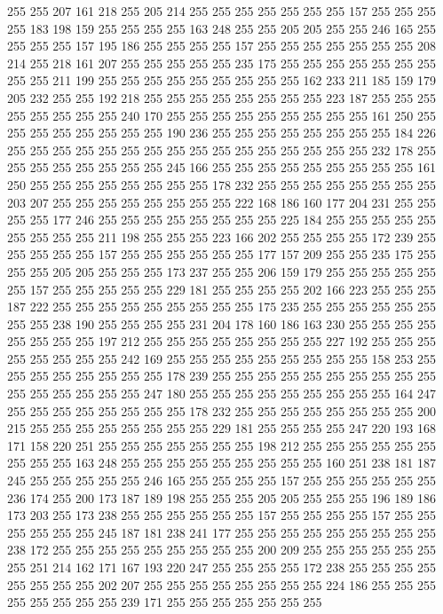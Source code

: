 255 255 207 161 218 255 205 214 255 255 255 255 255 255 255 157 255 255 255 255
183 198 159 255 255 255 255 163 248 255 255 205 205 255 255 246 165 255 255 255
255 157 195 186 255 255 255 255 157 255 255 255 255 255 255 255 208 214 255 218
161 207 255 255 255 255 255 235 175 255 255 255 255 255 255 255 255 255 211 199
255 255 255 255 255 255 255 255 255 162 233 211 185 159 179 205 232 255 255 192
218 255 255 255 255 255 255 255 255 223 187 255 255 255 255 255 255 255 255 240
170 255 255 255 255 255 255 255 255 255 161 250 255 255 255 255 255 255 255 255
190 236 255 255 255 255 255 255 255 255 184 226 255 255 255 255 255 255 255 255
255 255 255 255 255 255 255 255 232 178 255 255 255 255 255 255 255 255 245 166
255 255 255 255 255 255 255 255 255 161 250 255 255 255 255 255 255 255 255 178
232 255 255 255 255 255 255 255 255 203 207 255 255 255 255 255 255 255 255 222
168 186 160 177 204 231 255 255 255 255 177 246 255 255 255 255 255 255 255 255
225 184 255 255 255 255 255 255 255 255 255 211 198 255 255 255 223 166 202 255
255 255 255 172 239 255 255 255 255 255 157 255 255 255 255 255 255 177 157 209
255 255 235 175 255 255 255 205 205 255 255 255 173 237 255 255 206 159 179 255
255 255 255 255 255 157 255 255 255 255 255 229 181 255 255 255 255 202 166 223
255 255 255 187 222 255 255 255 255 255 255 255 255 255 175 235 255 255 255 255
255 255 255 255 238 190 255 255 255 255 231 204 178 160 186 163 230 255 255 255
255 255 255 255 255 197 212 255 255 255 255 255 255 255 255 227 192 255 255 255
255 255 255 255 255 242 169 255 255 255 255 255 255 255 255 255 158 253 255 255
255 255 255 255 255 255 178 239 255 255 255 255 255 255 255 255 255 255 255 255
255 255 255 255 247 180 255 255 255 255 255 255 255 255 255 164 247 255 255 255
255 255 255 255 255 178 232 255 255 255 255 255 255 255 255 200 215 255 255 255
255 255 255 255 255 229 181 255 255 255 255 247 220 193 168 171 158 220 251 255
255 255 255 255 255 255 198 212 255 255 255 255 255 255 255 255 255 163 248 255
255 255 255 255 255 255 255 255 160 251 238 181 187 245 255 255 255 255 255 246
165 255 255 255 255 157 255 255 255 255 255 255 236 174 255 200 173 187 189 198
255 255 255 205 205 255 255 255 196 189 186 173 203 255 173 238 255 255 255 255
255 255 157 255 255 255 255 157 255 255 255 255 255 255 245 187 181 238 241 177
255 255 255 255 255 255 255 255 255 238 172 255 255 255 255 255 255 255 255 255
200 209 255 255 255 255 255 255 255 251 214 162 171 167 193 220 247 255 255 255
255 172 238 255 255 255 255 255 255 255 255 202 207 255 255 255 255 255 255 255
255 224 186 255 255 255 255 255 255 255 255 239 171 255 255 255 255 255 255 255
